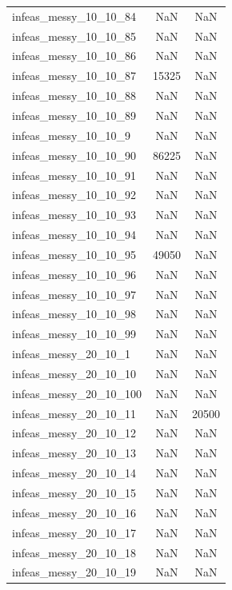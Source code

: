 \begin{longtable}{lcc}
infeas\_messy\_10\_10\_84  &      NaN &    NaN \\
infeas\_messy\_10\_10\_85  &      NaN &    NaN \\
infeas\_messy\_10\_10\_86  &      NaN &    NaN \\
infeas\_messy\_10\_10\_87  &    15325 &    NaN \\
infeas\_messy\_10\_10\_88  &      NaN &    NaN \\
infeas\_messy\_10\_10\_89  &      NaN &    NaN \\
infeas\_messy\_10\_10\_9   &      NaN &    NaN \\
infeas\_messy\_10\_10\_90  &    86225 &    NaN \\
infeas\_messy\_10\_10\_91  &      NaN &    NaN \\
infeas\_messy\_10\_10\_92  &      NaN &    NaN \\
infeas\_messy\_10\_10\_93  &      NaN &    NaN \\
infeas\_messy\_10\_10\_94  &      NaN &    NaN \\
infeas\_messy\_10\_10\_95  &    49050 &    NaN \\
infeas\_messy\_10\_10\_96  &      NaN &    NaN \\
infeas\_messy\_10\_10\_97  &      NaN &    NaN \\
infeas\_messy\_10\_10\_98  &      NaN &    NaN \\
infeas\_messy\_10\_10\_99  &      NaN &    NaN \\
infeas\_messy\_20\_10\_1   &      NaN &    NaN \\
infeas\_messy\_20\_10\_10  &      NaN &    NaN \\
infeas\_messy\_20\_10\_100 &      NaN &    NaN \\
infeas\_messy\_20\_10\_11  &      NaN &  20500 \\
infeas\_messy\_20\_10\_12  &      NaN &    NaN \\
infeas\_messy\_20\_10\_13  &      NaN &    NaN \\
infeas\_messy\_20\_10\_14  &      NaN &    NaN \\
infeas\_messy\_20\_10\_15  &      NaN &    NaN \\
infeas\_messy\_20\_10\_16  &      NaN &    NaN \\
infeas\_messy\_20\_10\_17  &      NaN &    NaN \\
infeas\_messy\_20\_10\_18  &      NaN &    NaN \\
infeas\_messy\_20\_10\_19  &      NaN &    NaN \\

\end{longtable}
